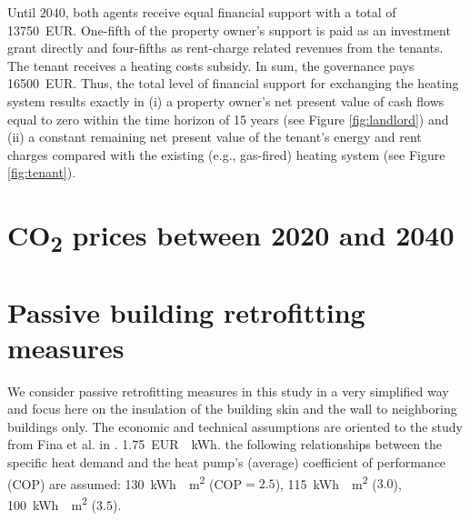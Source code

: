 \documentclass[review]{elsarticle}
\begin{document}
Until $2040$, both agents receive equal financial support with a total of \SI{13750}{EUR}. One-fifth of the property owner's support is paid as an investment grant directly and four-fifths as rent-charge related revenues from the tenants. The tenant receives a heating costs subsidy. In sum, the governance pays \SI{16500}{EUR}. Thus, the total level of financial support for exchanging the heating system results exactly in (i) a property owner's net present value of cash flows equal to zero within the time horizon of 15 years (see Figure \ref{fig:landlord}) and (ii) a constant remaining net present value of the tenant's energy and rent charges compared with the existing (e.g., gas-fired) heating system (see Figure \ref{fig:tenant}). 

\section{CO\textsubscript{2} prices between 2020 and 2040}\label{app:data}

\begin{table}[h]
	\centering
	\caption{CO\textsubscript{2} price development}
	\label{tab:time}
\end{table}

\section{Passive building retrofitting measures}\label{app:passive}
We consider passive retrofitting measures in this study in a very simplified way and focus here on the insulation of the building skin and the wall to neighboring buildings only. The economic and technical assumptions are oriented to the study from Fina et al. in \cite{fina2020profitability}.  \SI{1.75}{EUR \per kWh}.  the following relationships between the specific heat demand and the heat pump's (average) coefficient of performance (COP) are assumed: \SI{130}{kWh \per m^2} (COP$=2.5$), \SI{115}{kWh \per m^2} ($3.0$), \SI{100}{kWh \per m^2} ($3.5$). 
\end{document}
